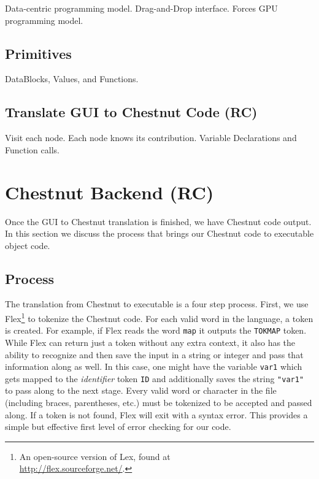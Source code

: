 \documentclass[twocolumn]{article}
\renewcommand{\|}{\origbar} %
\newcommand{\code}[1]{\texttt{#1}}
\begin{document}
Data-centric programming model. Drag-and-Drop interface. Forces GPU programming model.

\subsection{Primitives}

DataBlocks, Values, and Functions.

\subsection{Translate GUI to Chestnut Code (RC)}

Visit each node. Each node knows its contribution. Variable Declarations and Function calls.

\section{Chestnut Backend (RC)}

Once the GUI to Chestnut translation is finished, we have Chestnut code output. In this section we discuss the process that brings our Chestnut code to executable object code.

\subsection{Process}

The translation from Chestnut to executable is a four step process. First, we use Flex\footnote{An open-source version of Lex, found at \\ \url{http://flex.sourceforge.net/}.} to tokenize the Chestnut code. For each valid word in the language, a token is created. For example, if Flex reads the word \code{map} it outputs the \code{TOKMAP} token. While Flex can return just a token without any extra context, it also has the ability to recognize and then save the input in a string or integer and pass that information along as well. In this case, one might have the variable \code{var1} which gets mapped to the {\em identifier} token \code{ID} and additionally saves the string \code{"var1"} to pass along to the next stage. Every valid word or character in the file (including braces, parentheses, etc.) must be tokenized to be accepted and passed along. If a token is not found, Flex will exit with a syntax error. This provides a simple but effective first level of error checking for our code.
\end{document}
